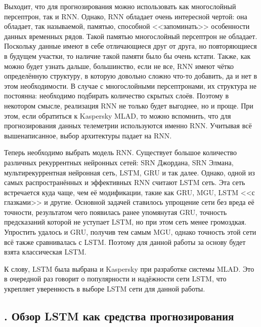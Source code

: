 {  \par \redline Выходит, что для прогнозирования можно использовать как многослойный персептрон, так и RNN. Однако, RNN обладает очень интересной чертой: она обладает, так называемой, памятью, способной <<запоминать>> особенности данных временных рядов. Такой памятью многослойный персептрон не обладает. Поскольку данные имеют в себе отличающиеся друг от друга, но повторяющиеся в будущем участки, то наличие такой памяти было бы очень кстати. Также, как можно будет узнать дальше, большинство, если не все, RNN имеют чётко определённую структуру, в которую довольно сложно что-то добавить, да и нет в этом необходимости. В случае с многослойными персептронами, их структура не постоянна: необходимо подбирать количество скрытых слоёв. Поэтому в некотором смысле, реализация RNN не только будет выгоднее, но и проще. При этом, если обратиться к Kaspersky MLAD, то можно вспомнить, что для прогнозирования данных телеметрии используются именно RNN. Учитывая всё вышенаписанное, выбор архитектуры падает на RNN.

  \par \redline Теперь необходимо выбрать модель RNN. Существует большое количество различных рекуррентных нейронных сетей: SRN Джордана, SRN Элмана, мультирекуррентная нейронная сеть, LSTM, GRU и так далее. Однако, одной из самых распространённых и эффективных RNN считают LSTM сеть. Эта сеть встречается куда чаще, чем её модификации, такие как GRU, MGU, LSTM <<с глазками>> и другие. Основной задачей ставилось упрощение сети без вреда её точности, результатом чего появилась ранее упомянутая GRU, точность предсказаний которой не уступает LSTM, но при этом сеть менее громоздкая. Упростить удалось и GRU, получив тем самым MGU, однако точность этой сети всё также сравнивалась с LSTM. Поэтому для данной работы за основу будет взята классическая LSTM.

  \par \redline К слову, LSTM была выбрана и Kaspersky при разработке системы MLAD. Это в очередной раз говорит о популярности и надёжности сети LSTM, что укрепляет уверенность в выборе LSTM сети для данной работы. 

  \par
}

\subtitlespace

\subsection*{ 
  \gostTitleFont
  \redline
  \thechaptercntr .\thesubchaptercntr \spc 
  Обзор LSTM как средства прогнозирования
} \addtocounter{subchaptercntr}{1} 
  
